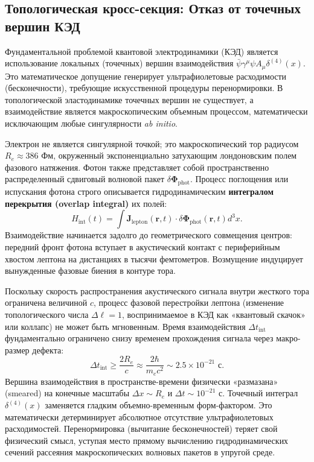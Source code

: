 \documentclass[11pt,a4paper]{article}
\begin{document}
	\subsection{Топологическая кросс-секция: Отказ от точечных вершин КЭД}
	Фундаментальной проблемой квантовой электродинамики (КЭД) является использование локальных (точечных) вершин взаимодействия $\bar{\psi}\gamma^\mu\psi A_\mu \delta^{(4)}(x)$. Это математическое допущение генерирует ультрафиолетовые расходимости (бесконечности), требующие искусственной процедуры перенормировки. В топологической эластодинамике точечных вершин не существует, а взаимодействие является макроскопическим объемным процессом, математически исключающим любые сингулярности \textit{ab initio}.
	
	Электрон не является сингулярной точкой; это макроскопический тор радиусом $R_e \approx 386$ Фм, окруженный экспоненциально затухающим лондоновским полем фазового натяжения. Фотон также представляет собой пространственно распределенный сдвиговый волновой пакет $\delta \mathbf{\Phi}_{\text{phot}}$. 
	Процесс поглощения или испускания фотона строго описывается гидродинамическим \textbf{интегралом перекрытия (overlap integral)} их полей:
	\begin{equation}
		H_{\text{int}}(t) = \int \mathbf{J}_{\text{lepton}}(\mathbf{r}, t) \cdot \delta \mathbf{\Phi}_{\text{phot}}(\mathbf{r}, t) d^3x.
	\end{equation}
	Взаимодействие начинается задолго до геометрического совмещения центров: передний фронт фотона вступает в акустический контакт с периферийным хвостом лептона на дистанциях в тысячи фемтометров. Возмущение индуцирует вынужденные фазовые биения в контуре тора.
	
	Поскольку скорость распространения акустического сигнала внутри жесткого тора ограничена величиной $c$, процесс фазовой перестройки лептона (изменение топологического числа $\Delta \ell = 1$, воспринимаемое в КЭД как «квантовый скачок» или коллапс) не может быть мгновенным. Время взаимодействия $\Delta t_{\text{int}}$ фундаментально ограничено снизу временем прохождения сигнала через макро-размер дефекта:
	\begin{equation}
		\Delta t_{\text{int}} \ge \frac{2 R_e}{c} \approx \frac{2 \hbar}{m_e c^2} \sim 2.5 \times 10^{-21} \text{ с}.
	\end{equation}
	Вершина взаимодействия в пространстве-времени физически «размазана» (smeared) на конечные масштабы $\Delta x \sim R_e$ и $\Delta t \sim 10^{-21}$ с. Точечный интеграл $\delta^{(4)}(x)$ заменяется гладким объемно-временным форм-фактором. Это математически детерминирует абсолютное отсутствие ультрафиолетовых расходимостей. 
	Перенормировка (вычитание бесконечностей) теряет свой физический смысл, уступая место прямому вычислению гидродинамических сечений рассеяния макроскопических волновых пакетов в упругой среде.
	
\end{document}
